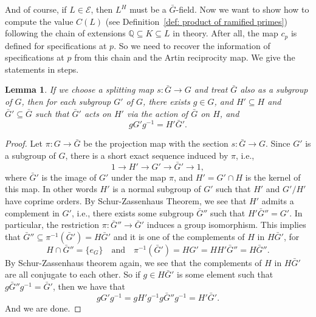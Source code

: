 \documentclass{amsart}
\numberwithin{equation}{section}
\theoremstyle{plain}
\newtheorem{lemma}[theorem]{Lemma}
\theoremstyle{definition}
\theoremstyle{remark}
\begin{document}
And of course, if $L\in\mathcal{E}$, then $L^{H}$ must be a $\bar{G}$-field.
Now we want to show how to compute the value $C(L)$ (see Definition~\ref{def: product of ramified primes}) following the chain of extensions $\mathbb{Q}\subseteq K\subseteq L$ in theory.
After all, the map $c_{p}$ is defined for specifications at $p$.
So we need to recover the information of specifications at $p$ from this chain and the Artin reciprocity map.
We give the statements in steps.
\begin{lemma}\label{lemma: c(Sigma) in general case 1}
	If we choose a splitting map $s:\bar{G}\to G$ and treat $\bar{G}$ also as a subgroup of $G$, 
	then for each subgroup $G'$ of $G$, there exists $g\in G$, and $H'\subseteq H$ and $\bar{G}'\subseteq\bar{G}$ such that $\bar{G}'$ acts on $H'$ via the action of $\bar{G}$ on $H$, and
	\begin{equation*}
		gG'g^{-1}=H'\bar{G}'.
	\end{equation*}
\end{lemma}
\begin{proof}
	Let $\pi:G\to\bar{G}$ be the projection map with the section $s:\bar{G}\to G$.
	Since $G'$ is a subgroup of $G$, there is a short exact sequence induced by $\pi$, i.e.,
	\begin{equation*}
		1\to H'\to G'\to\bar{G}'\to1,
	\end{equation*}
	where $\bar{G}'$ is the image of $G'$ under the map $\pi$, and $H'=G'\cap H$ is the kernel of this map.
	In other words $H'$ is a normal subgroup of $G'$ such that $H'$ and $G'/H'$ have coprime orders.
	By Schur-Zassenhaus Theorem, we see that $H'$ admits a complement in $G'$, i.e., there exists some subgroup $\bar{G}''$ such that $H'\bar{G}''=G'$.
	In particular, the restriction $\pi:\bar{G}''\to\bar{G}'$ induces a group isomorphism.
	This implies that $\bar{G}''\subseteq\pi^{-1}(\bar{G}')=H\bar{G}'$ and it is one of the complements of $H$ in $H\bar{G}'$, for
	\begin{equation*}
		H\cap\bar{G}''=\{e_G\}\quad\text{and}\quad\pi^{-1}(\bar{G}')=HG'=HH'\bar{G}''=H\bar{G}''.
	\end{equation*}
	By Schur-Zassenhaus theorem again, we see that the complements of $H$ in $H\bar{G}'$ are all conjugate to each other.
	So if $g\in H\bar{G}'$ is some element such that $g\bar{G}''g^{-1}=\bar{G}'$, then we have that
	\begin{equation*}
		gG'g^{-1}=gH'g^{-1}g\bar{G}''g^{-1}=H'\bar{G}'.
	\end{equation*}
	And we are done.
\end{proof}
\end{document}
